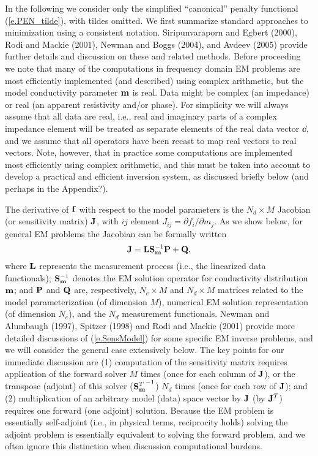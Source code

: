 In the following we consider only the simplified ``canonical'' penalty 
functional (\ref{e.PEN_tilde}),
with tildes omitted.  We first summarize standard approaches
to minimization using a consistent notation.
Siripunvaraporn and Egbert (2000), Rodi and Mackie (2001), 
Newman and Boggs (2004), and Avdeev (2005) 
provide further details and discussion on these and related methods.
Before proceeding we note that
many of the computations in frequency domain 
EM problems are most efficiently implemented
(and described) using complex arithmetic, but the model
conductivity parameter ${\bf m}$ is real.  
Data might be complex (an impedance)
or real (an apparent resistivity and/or phase).  
For simplicity we will always assume that all data are real, i.e.,
real and imaginary parts of a complex impedance element 
will be treated as separate elements of 
the real data vector $\dd$, and we assume that all operators 
have been recast to map real vectors to real vectors.
Note, however, that in practice some computations are implemented 
most efficiently using complex arithmetic, and this must
be taken into account to develop a practical and
efficient inversion system, as discussed briefly below (and perhaps
in the Appendix?).

The derivative of ${\bf f}$ with respect to
the model parameters is the $N_d \times M$ 
Jacobian (or sensitivity matrix) ${\bf J}$, with $ij$ element 
$J_{ij} = \partial f_i / \partial m_j$.  
As we show below,
for general EM problems the Jacobian can be formally written
\begin{equation}
\label{e.SensModel}
{\bf J} = {\bf L} {\bf S}_{{\bf m}}^{-1} {\bf P} + {\bf Q}  ,
\end{equation}
where ${\bf L}$ represents the measurement process (i.e., the
linearized data functionals);
${\bf S}_{{\bf m}}^{-1}$ denotes the EM solution operator
for conductivity distribution ${\bf m}$;
and ${\bf P}$ and ${\bf Q}$ are, respectively, $N_e \times M$
and $N_d \times M$ matrices related to the 
model parameterization (of dimension $M$), numerical
EM solution representation (of dimension $N_e$), 
and the $N_d$ measurement functionals.
Newman and Alumbaugh (1997), Spitzer (1998)
and Rodi and Mackie (2001) provide more detailed discussions
of (\ref{e.SensModel}) for some specific EM inverse problems,
and we will consider the general case extensively below.
The key points for our immediate discussion
are (1) computation of the sensitivity matrix requires
application of the forward solver $M$ times (once for
each column of ${\bf J}$), or the transpose (adjoint) of this solver
(${{\bf S}_{{\bf m}}^T}^{-1}$)  $N_d$ times (once for each row of ${\bf J}$);
and (2) multiplication of an arbitrary model (data) space vector by 
${\bf J}$  (by ${\bf J}^T$) requires one forward (one adjoint) solution.
Because the EM problem is essentially self-adjoint (i.e.,
in physical terms, reciprocity holds) solving the adjoint
problem is essentially equivalent to solving the forward problem,
and we often ignore this distinction when discussion
computational burdens.

